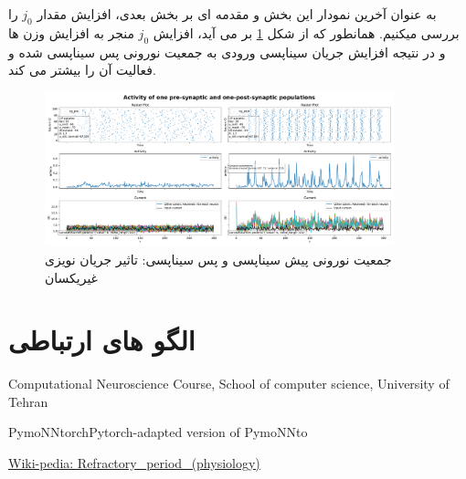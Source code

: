 \documentclass{report}
\begin{document}
        به عنوان آخرین نمودار این بخش و مقدمه ای بر بخش بعدی، افزایش مقدار 
        $j_0$ 
        را بررسی میکنیم. همانطور که از شکل 
        \ref{fig:part1-two-ng-with-synapse-high-diff-curr-high-j}
        بر می آید، افزایش 
        $j_0$ 
        منجر به افزایش وزن ها و در نتیجه افزایش جریان سیناپسی ورودی به جمعیت نورونی پس سیناپسی شده و فعالیت آن را بیشتر می کند.
        \begin{figure}[!ht]
            \centering
            \includegraphics[width=0.9\textwidth]{plots/part1-two-ng-with-synapse-high-diff-curr-high-j.pdf} 
            \caption{جمعیت نورونی پیش سیناپسی و پس سیناپسی: تاثیر جریان نویزی غیریکسان}
            \label{fig:part1-two-ng-with-synapse-high-diff-curr-high-j}
        \end{figure}

\newpage
\section{الگو های ارتباطی}
\newpage
\begin{thebibliography}{1}
        \begin{latin}
            Computational Neuroscience Course, School of computer science, University of Tehran
        \end{latin}
        \begin{latin}
            PymoNNtorchPytorch-adapted version of PymoNNto
        \end{latin}
        \begin{latin}
            \href{https://en.wikipedia.org/wiki/Refractory_period_(physiology)}{Wiki-pedia: Refractory\_period\_(physiology)}
        \end{latin}
    \end{thebibliography}
\end{document}

